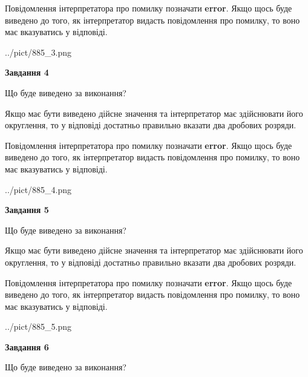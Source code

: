 \documentclass[12pt, ukrainian]{article}
\begin{document}
{\begin {Large}
Повідомлення інтерпретатора про помилку позначати \textbf{error}.
Якщо щось буде виведено до того, як інтерпретатор видасть повідомлення про помилку, 
то воно має вказуватись у відповіді. \par

\begin{center}
	{../pict/885_3.png}
\end{center}
\newpage

{\begin {center}\textbf{Завдання 4}\end {center}}\par
Що буде виведено за виконання? \par

Якщо має бути виведено дійсне значення та інтерпретатор має здійснювати його округлення, 
то у відповіді достатньо правильно вказати два дробових розряди.

Повідомлення інтерпретатора про помилку позначати \textbf{error}.
Якщо щось буде виведено до того, як інтерпретатор видасть повідомлення про помилку, 
то воно має вказуватись у відповіді. \par

\begin{center}
	{../pict/885_4.png}
\end{center}
\newpage

{\begin {center}\textbf{Завдання 5}\end {center}}\par
Що буде виведено за виконання? \par

Якщо має бути виведено дійсне значення та інтерпретатор має здійснювати його округлення, 
то у відповіді достатньо правильно вказати два дробових розряди.

Повідомлення інтерпретатора про помилку позначати \textbf{error}.
Якщо щось буде виведено до того, як інтерпретатор видасть повідомлення про помилку, 
то воно має вказуватись у відповіді. \par

\begin{center}
	{../pict/885_5.png}
\end{center}
\newpage

{\begin {center}\textbf{Завдання 6}\end {center}}\par
Що буде виведено за виконання? \par


\end{Large}}
\end{document}
